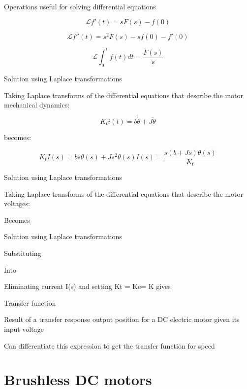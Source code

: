 \documentclass[compress]{beamer}
\begin{document}
\begin{frame}{Operations useful for solving differential equations}

\Large

\[
    \mathcal{L} {f'(t)} = sF(s) - f(0)
\]


\[
    \mathcal{L} {f''(t)} = s^2F(s) - sf(0) - f'(0)
\]


\[
    \mathcal{L} {\int^{t}_{0}f(t)dt} = \frac{F(s)}{s}
\]


\end{frame}

\begin{frame}{Solution using Laplace transformations}

Taking Laplace transforms of the differential equations that describe
the motor mechanical dynamics:

\[
    K_t i(t) = b \dot\theta + J \ddot\theta
\]

becomes:

\[
    K_t I(s) = bs \theta(s) + Js^2 \theta(s)

    I(s) = \frac{s(b+Js)\theta(s)}{K_t}
\]


\end{frame}

\begin{frame}{Solution using Laplace transformations}

Taking Laplace transforms of the differential equations that describe
the motor voltages:

Becomes

\end{frame}

\begin{frame}{Solution using Laplace transformations}

Substituting

Into

Eliminating current I(s) and setting Kt = Ke= K gives

\end{frame}

\begin{frame}{Transfer function}

Result of a transfer response output position for a DC electric motor
given its input voltage

Can differentiate this expression to get the transfer function for speed

\end{frame}

\section{Brushless DC motors}
\end{document}
